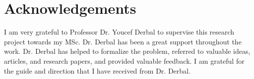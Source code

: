\section*{Acknowledgements}

I am very grateful to Professor Dr. Youcef Derbal to supervise this research project towards my MSc. Dr. Derbal has been a great support throughout the work. Dr. Derbal has helped to formalize the problem, referred to valuable ideas, articles, and research papers, and provided valuable feedback. I am grateful for the guide and direction that I have received from Dr. Derbal.



